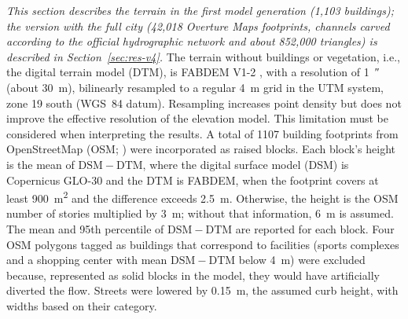 \emph{This section describes the terrain in the first model generation (1,103 buildings); the version with the full city (42,018 Overture Maps footprints, channels carved according to the official hydrographic network and about 852,000 triangles) is described in Section~\ref{sec:res-v4}.} The terrain without buildings or vegetation, i.e., the digital terrain model (DTM), is FABDEM V1-2 \citep{hawker2022,fabdem2023}, with a resolution of \SI{1}{\arcsecond} (about \SI{30}{m}), bilinearly resampled to a regular \SI{4}{m} grid in the UTM system, zone 19 south (WGS~84 datum). Resampling increases point density but does not improve the effective resolution of the elevation model. This limitation must be considered when interpreting the results. A total of \num{1107} building footprints from OpenStreetMap (OSM; \citealp{osm2026}) were incorporated as raised blocks. Each block's height is the mean of $\mathrm{DSM}-\mathrm{DTM}$, where the digital surface model (DSM) is Copernicus GLO-30 \citep{copernicus_glo30} and the DTM is FABDEM, when the footprint covers at least \SI{900}{m^2} and the difference exceeds \SI{2.5}{m}. Otherwise, the height is the OSM number of stories multiplied by \SI{3}{m}; without that information, \SI{6}{m} is assumed. The mean and 95th percentile of $\mathrm{DSM}-\mathrm{DTM}$ are reported for each block. Four OSM polygons tagged as buildings that correspond to facilities (sports complexes and a shopping center with mean $\mathrm{DSM}-\mathrm{DTM}$ below \SI{4}{m}) were excluded because, represented as solid blocks in the model, they would have artificially diverted the flow. Streets were lowered by \SI{0.15}{m}, the assumed curb height, with widths based on their category.
